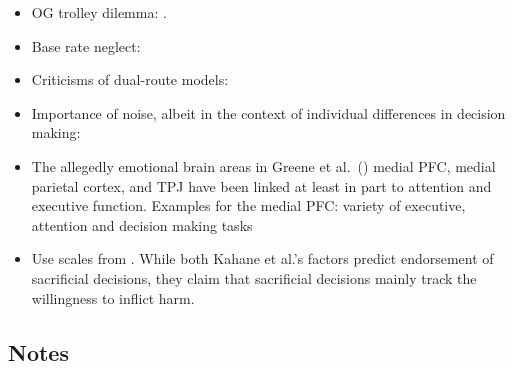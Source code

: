 \documentclass[
]{article}
\providecommand{\tightlist}{%
  \setlength{\itemsep}{0pt}\setlength{\parskip}{0pt}}
\begin{document}
\begin{itemize}
\tightlist
\item
  OG trolley dilemma: \autocite{Foot1967}.
\item
  Base rate neglect: \autocite{Kahneman2011}
\item
  Criticisms of dual-route models: \autocite{DeNeys2021}
\item
  Importance of noise, albeit in the context of individual differences in decision making: \autocite{Kahneman2021}
\item
  The allegedly emotional brain areas in Greene et al.~(\autocite{Greene2001-moral}) medial PFC, medial parietal cortex, and TPJ have been linked at least in part to attention and executive function. Examples for the medial PFC: variety of executive, attention and decision making tasks \autocite{Euston2012,Jobson2021}
\item
  Use scales from \autocite{Kahane2018}. While both Kahane et al.'s \autocite*{Kahane2018} factors predict endorsement of sacrificial decisions, they claim that sacrificial decisions mainly track the willingness to inflict harm.
\end{itemize}

\subsection{Notes}\label{notes}
\end{document}
